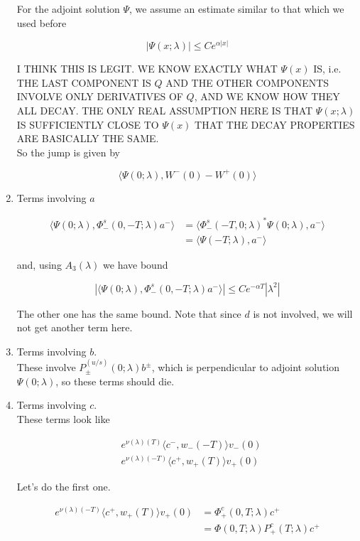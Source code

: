 \documentclass[12pt]{article}
\begin{document}
\begin{enumerate}
For the adjoint solution $\Psi$, we assume an estimate similar to that which we used before

\[
|\Psi(x; \lambda)| \leq C e^{\alpha|x|}
\]

I THINK THIS IS LEGIT. WE KNOW EXACTLY WHAT $\Psi(x)$ IS, i.e. THE LAST COMPONENT IS $Q$ AND THE OTHER COMPONENTS INVOLVE ONLY DERIVATIVES OF $Q$, AND WE KNOW HOW THEY ALL DECAY. THE ONLY REAL ASSUMPTION HERE IS THAT $\Psi(x; \lambda)$ IS SUFFICIENTLY CLOSE TO $\Psi(x)$ THAT THE DECAY PROPERTIES ARE BASICALLY THE SAME.\\

So the jump is given by

\[
\langle \Psi(0; \lambda), W^-(0) - W^+(0) \rangle 
\]

\item Terms involving $a$

\begin{align*}
\langle \Psi(0; \lambda), \Phi^s_-(0, -T; \lambda )a^- \rangle &= \langle \Phi^s_-(-T, 0; \lambda )^* \Psi(0; \lambda), a^- \rangle \\
&= \langle \Psi(-T; \lambda), a^- \rangle 
\end{align*}

and, using $A_3(\lambda)$ we have bound

\[
|\langle \Psi(0; \lambda), \Phi^s_-(0, -T; \lambda )a^- \rangle| \leq C  e^{-\alpha T} |\lambda^2|
\]

The other one has the same bound. Note that since $d$ is not involved, we will not get another term here.

\item Terms involving $b$.\\

These involve $P^{(u/s)}_\pm(0; \lambda)b^\pm$, which is perpendicular to adjoint solution $\Psi(0; \lambda)$, so these terms should die.

\item Terms involving $c$.\\

These terms look like

\begin{align*}
&e^{\nu(\lambda)(T)}  \langle c^-, w_-(-T) \rangle v_-(0) \\
&e^{\nu(\lambda)(-T)} \langle c^+, w_+(T) \rangle v_+(0) 
\end{align*}

Let's do the first one.

\begin{align*}
e^{\nu(\lambda)(-T)} \langle c^+, w_+(T) \rangle v_+(0)  &= \Phi^c_+(0, T; \lambda)c^+\\
&= \Phi(0, T; \lambda) P^c_+(T;\lambda ) c^+
\end{align*}


\end{enumerate}
\end{document}

